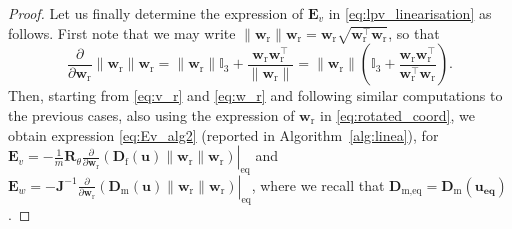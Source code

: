 \begin{proof}
Let us finally determine the expression of $\boldsymbol{E}_{v}$
in \eqref{eq:lpv_linearisation}
as follows. First note that we may write
$\|\boldsymbol{w}_\text{r}\| \boldsymbol{w}_\text{r} = 
 \boldsymbol{w}_\text{r} \sqrt{\boldsymbol{w}_\text{r}^\top \boldsymbol{w}_\text{r}  }$,
so that
$$
\frac{\partial }{\partial \boldsymbol{w}_\text{r}}
\|\boldsymbol{w}_\text{r}\| \boldsymbol{w}_\text{r} = 
\|\boldsymbol{w}_\text{r}\| \mathbb{I}_3
+ \frac{\boldsymbol{w}_\text{r} \boldsymbol{w}_\text{r}^\top}{\|\boldsymbol{w}_\text{r}\|} = 
\|\boldsymbol{w}_\text{r}\|
\left( \mathbb{I}_3 + \frac{\boldsymbol{w}_\text{r} \boldsymbol{w}_\text{r}^\top}{\boldsymbol{w}_\text{r}^\top \boldsymbol{w}_\text{r}} \right).
$$
Then, starting from \eqref{eq:v_r} and \eqref{eq:w_r}
and following similar computations to the previous cases,
also using the expression of $\boldsymbol{w}_\text{r}$
in \eqref{eq:rotated_coord}, we obtain expression
\eqref{eq:Ev_alg2} (reported in Algorithm~\ref{alg:linea}), for $\boldsymbol{E}_{v} = -  \frac{1}{m} \boldsymbol{R}_\theta 
 \left. \frac{\partial}{\partial \boldsymbol{w}_\text{r}} 
 \left(  \! \boldsymbol{D}_{\text{f}}(\boldsymbol{u}) \lVert \boldsymbol{w}_{\text{r}} \rVert \boldsymbol{w}_{\text{r}}  \right)\right|_{\mathrm{eq}} $ and  
 $\boldsymbol{E}_{w} = - \boldsymbol{J}^{-1} \left.
 \frac{\partial}{\partial \boldsymbol{w}_\text{r}}
     \left(  \boldsymbol{D}_{\text{m}}(\boldsymbol{u}) \lVert \boldsymbol{w}_{\text{r}} \rVert \boldsymbol{w}_{\text{r}}\right)\right|_{\mathrm{eq}}$, where we recall that $\boldsymbol{D}_{\text{m,eq}} = \boldsymbol{D}_{\text{m}}(\boldsymbol{u_{\text{eq}}})$.
%

\end{proof}
